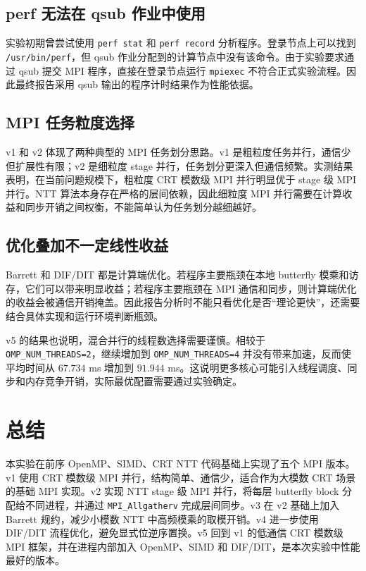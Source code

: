 \documentclass[a4paper]{article}
\begin{document}
\subsection{perf 无法在 qsub 作业中使用}

实验初期曾尝试使用 \texttt{perf stat} 和 \texttt{perf record} 分析程序。登录节点上可以找到 \texttt{/usr/bin/perf}，但 qsub 作业分配到的计算节点中没有该命令。由于实验要求通过 qsub 提交 MPI 程序，直接在登录节点运行 \texttt{mpiexec} 不符合正式实验流程。因此最终报告采用 qsub 输出的程序计时结果作为性能依据。

\subsection{MPI 任务粒度选择}

v1 和 v2 体现了两种典型的 MPI 任务划分思路。v1 是粗粒度任务并行，通信少但扩展性有限；v2 是细粒度 stage 并行，任务划分更深入但通信频繁。实测结果表明，在当前问题规模下，粗粒度 CRT 模数级 MPI 并行明显优于 stage 级 MPI 并行。NTT 算法本身存在严格的层间依赖，因此细粒度 MPI 并行需要在计算收益和同步开销之间权衡，不能简单认为任务划分越细越好。

\subsection{优化叠加不一定线性收益}

Barrett 和 DIF/DIT 都是计算端优化。若程序主要瓶颈在本地 butterfly 模乘和访存，它们可以带来明显收益；若程序主要瓶颈在 MPI 通信和同步，则计算端优化的收益会被通信开销掩盖。因此报告分析时不能只看优化是否“理论更快”，还需要结合具体实现和运行环境判断瓶颈。

v5 的结果也说明，混合并行的线程数选择需要谨慎。相较于 \texttt{OMP\_NUM\_THREADS=2}，继续增加到 \texttt{OMP\_NUM\_THREADS=4} 并没有带来加速，反而使平均时间从 $67.734$ ms 增加到 $91.944$ ms。这说明更多核心可能引入线程调度、同步和内存竞争开销，实际最优配置需要通过实验确定。

\section{总结}

本实验在前序 OpenMP、SIMD、CRT NTT 代码基础上实现了五个 MPI 版本。v1 使用 CRT 模数级 MPI 并行，结构简单、通信少，适合作为大模数 CRT 场景的基础 MPI 实现。v2 实现 NTT stage 级 MPI 并行，将每层 butterfly block 分配给不同进程，并通过 \texttt{MPI\_Allgatherv} 完成层间同步。v3 在 v2 基础上加入 Barrett 规约，减少小模数 NTT 中高频模乘的取模开销。v4 进一步使用 DIF/DIT 流程优化，避免显式位逆序置换。v5 回到 v1 的低通信 CRT 模数级 MPI 框架，并在进程内部加入 OpenMP、SIMD 和 DIF/DIT，是本次实验中性能最好的版本。
\end{document}
